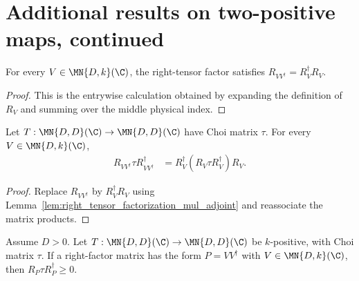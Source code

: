 \section{Additional results on two-positive maps, continued}

\begin{lemma}
    \label{lem:right_tensor_factorization_mul_adjoint}
    \leanok
    For every $V\in\MN{D,k}(\C)$, the right-tensor factor satisfies
    $R_{VV^\dagger}=R_V^\dagger R_V$.
\end{lemma}

\begin{proof}
    \leanok
    This is the entrywise calculation obtained by expanding the definition of
    $R_V$ and summing over the middle physical index.
\end{proof}

\begin{lemma}
    \label{lem:factorized_right_tensor_choi_sandwich}
    \leanok
    Let $T:\MN{D,D}(\C)\to\MN{D,D}(\C)$ have Choi matrix $\tau$. For every
    $V\in\MN{D,k}(\C)$,
    \begin{align}
        R_{VV^\dagger}\tau R_{VV^\dagger}^\dagger
         & =R_V^\dagger(R_V\tau R_V^\dagger)R_V.
        \label{eq:schwarz_factorized_choi_sandwich}
    \end{align}
\end{lemma}

\begin{proof}
    \leanok
    Replace $R_{VV^\dagger}$ by $R_V^\dagger R_V$ using
    Lemma~\ref{lem:right_tensor_factorization_mul_adjoint} and reassociate the
    matrix products.
\end{proof}

\begin{theorem}
    \label{thm:factorized_right_projection_choi_sandwich}
    \leanok
    Assume $D>0$. Let $T:\MN{D,D}(\C)\to\MN{D,D}(\C)$ be $k$-positive,
    with Choi matrix $\tau$. If a right-factor matrix has the form
    $P=VV^\dagger$ with $V\in\MN{D,k}(\C)$, then
    $R_P\tau R_P^\dagger\geq0$.
\end{theorem}

